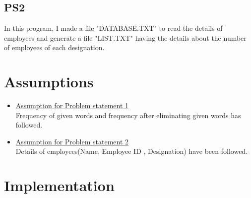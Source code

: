 \documentclass[11pt,a4paper]{article}
\begin{document}
\subsection{PS2}
\begin{flushleft}
In this program, I made a file "DATABASE.TXT" to read the details of employees and generate a file "LIST.TXT" having the details about the number of employees of each designation.
\end{flushleft}

\newpage
\centering
\section{Assumptions}
\begin{itemize}


\item \underline{Assumption for Problem statement 1}\\
\vspace{5mm}
Frequency of given words and frequency after eliminating given words has followed.



\end{itemize}
\begin{itemize}
\item \underline{Assumption for Problem statement 2}\\
\vspace{5mm}
Details of employees(Name, Employee ID , Designation) have been followed.
\end{itemize}


\newpage
\section{\LARGE Implementation}



\bigskip
\end{document}

